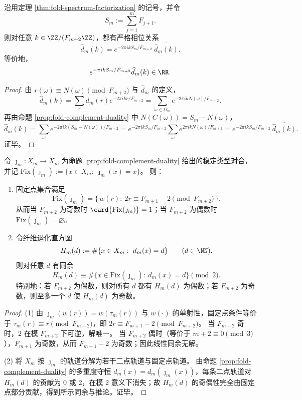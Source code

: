 \begin{corollary}\label{cor:fold-fourier-phase-locking-by-complement}
沿用定理 \ref{thm:fold-spectrum-factorization} 的记号，并令
\[
S_m:=\sum_{j=1}^m F_{j+1}.
\]
则对任意 \(k\in\ZZ/(F_{m+2}\ZZ)\)，都有严格相位关系
\[
\widehat d_m(k)=e^{-2\pi i kS_m/F_{m+2}}\ \overline{\widehat d_m(k)}.
\]
等价地，
\[
e^{-\pi i kS_m/F_{m+2}}\widehat d_m(k)\in\RR.
\]
\end{corollary}
\begin{proof}
由 \(r(\omega)\equiv N(\omega)\pmod{F_{m+2}}\) 与 \(\widehat d_m\) 的定义，
\[
\widehat d_m(k)=\sum_{r} d_m(r)e^{-2\pi i kr/F_{m+2}}
=\sum_{\omega\in\Omega_m}e^{-2\pi i kN(\omega)/F_{m+2}}.
\]
再由命题 \ref{prop:fold-complement-duality} 中 \(N(C(\omega))=S_m-N(\omega)\)，
\[
\widehat d_m(k)
=\sum_{\omega}e^{-2\pi i k(S_m-N(\omega))/F_{m+2}}
=e^{-2\pi i kS_m/F_{m+2}}\sum_{\omega}e^{2\pi i kN(\omega)/F_{m+2}}
=e^{-2\pi i kS_m/F_{m+2}}\ \overline{\widehat d_m(k)}.
\]
证毕。
\end{proof}

\begin{proposition}[补对偶的固定点与退化直方图的偶性约束]\label{prop:fold-complement-duality-fixedpoints-parity}
令 \(\jmath_m:X_m\to X_m\) 为命题 \ref{prop:fold-complement-duality} 给出的稳定类型对合，并记
\(
\mathrm{Fix}(\jmath_m):=\{x\in X_m:\ \jmath_m(x)=x\}
\)。
则：
\begin{enumerate}
\normalfont
  \item 固定点集合满足
  \[
  \mathrm{Fix}(\jmath_m)=\{\,w(r):\ 2r\equiv F_{m+1}-2\pmod{F_{m+2}}\,\}.
  \]
  从而当 \(F_{m+2}\) 为奇数时 \(\card{\mathrm{Fix}(\jmath_m)}=1\)；当 \(F_{m+2}\) 为偶数时 \(\mathrm{Fix}(\jmath_m)=\varnothing\)。
  \item 令纤维退化直方图
  \[
  H_m(d):=\#\{x\in X_m:\ d_m(x)=d\}\qquad(d\in\NN).
  \]
  则对任意 \(d\) 有同余
  \[
  H_m(d)\equiv \#\{x\in \mathrm{Fix}(\jmath_m):\ d_m(x)=d\}\pmod 2.
  \]
  特别地：若 \(F_{m+2}\) 为偶数，则对所有 \(d\) 都有 \(H_m(d)\) 为偶数；若 \(F_{m+2}\) 为奇数，则至多一个 \(d\) 使 \(H_m(d)\) 为奇数。
\end{enumerate}
\end{proposition}
\begin{proof}
(1) 由 \(\jmath_m(w(r))=w(\tau_m(r))\) 与 \(w(\cdot)\) 的单射性，固定点条件等价于 \(\tau_m(r)\equiv r\pmod{F_{m+2}}\)，即 \(2r\equiv F_{m+1}-2\pmod{F_{m+2}}\)。
当 \(F_{m+2}\) 奇时，\(2\) 在模 \(F_{m+2}\) 下可逆，解唯一。
当 \(F_{m+2}\) 偶时（等价于 \(m+2\equiv 0\pmod 3\)），\(F_{m+1}\) 为奇数，从而 \(F_{m+1}-2\) 为奇数；因此线性同余无解。
\par
(2) 将 \(X_m\) 按 \(\jmath_m\) 的轨道分解为若干二点轨道与固定点轨道。
由命题 \ref{prop:fold-complement-duality} 的多重度守恒 \(d_m(x)=d_m(\jmath_m(x))\)，每条二点轨道对 \(H_m(d)\) 的贡献为 \(0\) 或 \(2\)，在模 \(2\) 意义下消失；故 \(H_m(d)\) 的奇偶性完全由固定点部分贡献，得到所示同余与推论。证毕。
\end{proof}

